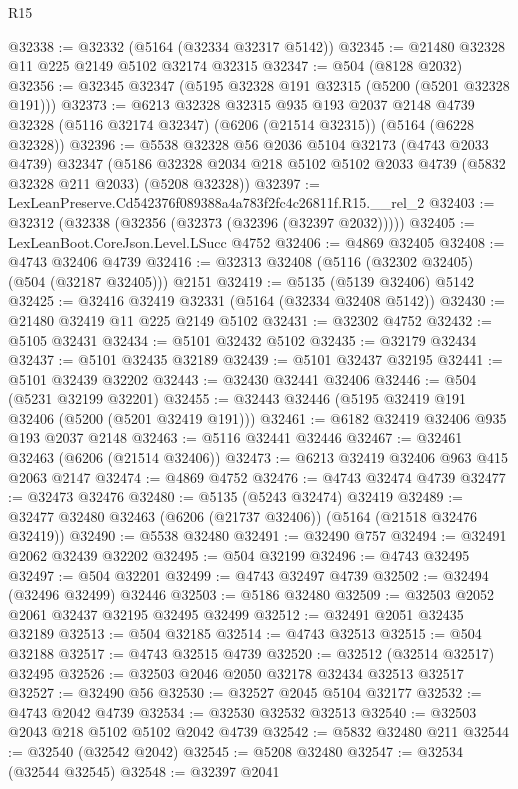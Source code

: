 \begin{lexlean}{R15}
\begin{coremodule}
{{{{{{{{{{{@32338 := @32332 (@5164 (@32334 @32317 @5142))
@32345 := @21480 @32328 @11 @225 @2149 @5102 @32174 @32315
@32347 := @504 (@8128 @2032)
@32356 := @32345 @32347 (@5195 @32328 @191 @32315 (@5200 (@5201 @32328 @191)))
@32373 := @6213
    @32328
    @32315
    @935
    @193
    @2037
    @2148
    @4739
    @32328
    (@5116 @32174 @32347)
    (@6206 (@21514 @32315))
    (@5164 (@6228 @32328))
@32396 := @5538
    @32328
    @56
    @2036
    @5104
    @32173
    (@4743 @2033 @4739)
    @32347
    (@5186 @32328 @2034 @218 @5102 @5102 @2033 @4739 (@5832 @32328 @211 @2033) (@5208 @32328))
@32397 := LexLeanPreserve.Cd542376f089388a4a783f2fc4c26811f.R15.__rel_2
@32403 := @32312 (@32338 (@32356 (@32373 (@32396 (@32397 @2032)))))
@32405 := LexLeanBoot.CoreJson.Level.LSucc @4752
@32406 := @4869 @32405
@32408 := @4743 @32406 @4739
@32416 := @32313 @32408 (@5116 (@32302 @32405) (@504 (@32187 @32405))) @2151
@32419 := @5135 (@5139 @32406) @5142
@32425 := @32416 @32419 @32331 (@5164 (@32334 @32408 @5142))
@32430 := @21480 @32419 @11 @225 @2149 @5102
@32431 := @32302 @4752
@32432 := @5105 @32431
@32434 := @5101 @32432 @5102
@32435 := @32179 @32434
@32437 := @5101 @32435 @32189
@32439 := @5101 @32437 @32195
@32441 := @5101 @32439 @32202
@32443 := @32430 @32441 @32406
@32446 := @504 (@5231 @32199 @32201)
@32455 := @32443 @32446 (@5195 @32419 @191 @32406 (@5200 (@5201 @32419 @191)))
@32461 := @6182 @32419 @32406 @935 @193 @2037 @2148
@32463 := @5116 @32441 @32446
@32467 := @32461 @32463 (@6206 (@21514 @32406))
@32473 := @6213 @32419 @32406 @963 @415 @2063 @2147
@32474 := @4869 @4752
@32476 := @4743 @32474 @4739
@32477 := @32473 @32476
@32480 := @5135 (@5243 @32474) @32419
@32489 := @32477 @32480 @32463 (@6206 (@21737 @32406)) (@5164 (@21518 @32476 @32419))
@32490 := @5538 @32480
@32491 := @32490 @757
@32494 := @32491 @2062 @32439 @32202
@32495 := @504 @32199
@32496 := @4743 @32495
@32497 := @504 @32201
@32499 := @4743 @32497 @4739
@32502 := @32494 (@32496 @32499) @32446
@32503 := @5186 @32480
@32509 := @32503 @2052 @2061 @32437 @32195 @32495 @32499
@32512 := @32491 @2051 @32435 @32189
@32513 := @504 @32185
@32514 := @4743 @32513
@32515 := @504 @32188
@32517 := @4743 @32515 @4739
@32520 := @32512 (@32514 @32517) @32495
@32526 := @32503 @2046 @2050 @32178 @32434 @32513 @32517
@32527 := @32490 @56
@32530 := @32527 @2045 @5104 @32177
@32532 := @4743 @2042 @4739
@32534 := @32530 @32532 @32513
@32540 := @32503 @2043 @218 @5102 @5102 @2042 @4739
@32542 := @5832 @32480 @211
@32544 := @32540 (@32542 @2042)
@32545 := @5208 @32480
@32547 := @32534 (@32544 @32545)
@32548 := @32397 @2041
}}}}}}}}}}}
\end{coremodule}
\end{lexlean}
